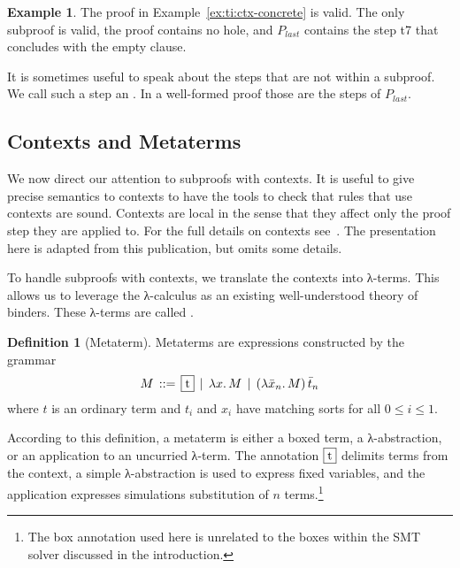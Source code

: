 \documentclass{scrartcl}
\newcommand\groundbox[1]{\boxed{#1}}
\theoremstyle{definition}
\newtheorem{example}{Example}
\newtheorem{definition}{Definition}[example]
\begin{document}
\begin{example}
The proof in Example~\ref{ex:ti:ctx-concrete} is valid.  The only
subproof is valid, the proof contains no hole, and $P_{\mathit{last}}$
contains the step \textsf{\color{SmtStepId} t7} that concludes with the empty clause.
\end{example}

It is sometimes useful to speak about the steps that are not within a
subproof.  We call such a step an .  In a well-formed proof those are the steps
of $P_{\mathit{last}}$.

\subsection{Contexts and Metaterms}

We now direct our attention to subproofs with contexts.
It is useful to give precise semantics
to contexts to have the tools to check that rules that use contexts
are sound.
Contexts are local in the sense that they affect only the
proof step they are applied to.
For the full details on contexts see~\cite{barbosa-2019}.
The presentation here is adapted from this publication, but omits some
details.

To handle subproofs with contexts, we translate the contexts into
λ-terms.
%
This allows us to
leverage the λ-calculus as an existing well-understood theory of binders.
%
These λ-terms are called .

\begin{definition}[Metaterm]
  Metaterms are expressions constructed by the grammar
  \[
    M \,::=\, \groundbox{$t$}\,\mid\, \lambda x.\,M\,\mid\,(\lambda \bar{x}_n.\,
    M)\,\bar{t}_n
  \]
where $t$ is an ordinary term and $t_i$ and $x_i$ have matching sorts for
all $0 \leq i \leq 1$.
\end{definition}

According to this definition, a metaterm is either a boxed term, a
λ-abstraction, or an application to an uncurried λ-term.
The annotation $\groundbox{$t$}$ delimits terms from the context, a simple
λ-abstraction is used to express fixed variables, and the
application expresses simulations substitution of $n$ terms.\footnote{
  The box annotation used here is unrelated to the boxes
  within the SMT solver discussed in the introduction.}
\end{document}
